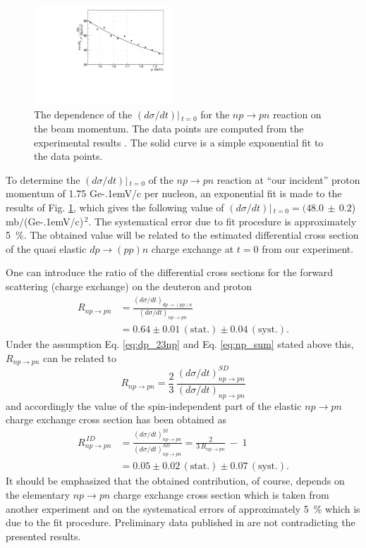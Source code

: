 \documentclass[twocolumn,epjc3]{svjour3}
\newcommand{\np}     {\ensuremath{np \rightarrow pn}\xspace}
\newcommand{\dpchex} {\ensuremath{dp \rightarrow (pp)n}\xspace}
\newcommand{\GeVc}   {Ge\kern-.1emV/c\xspace}
\begin{document}
\begin{figure}[ht]
  \centering
  \includegraphics[width=0.47\textwidth]{np_dSigma.pdf}
  \caption{The dependence of the $(d\sigma/dt)|\,_{t=0}$ for the \np reaction on
    the beam momentum. The data points are computed from the experimental
    results \cite{biz75}. The solid curve is a simple exponential fit to the
    data points.}
  \label{fig:npsigma}
\end{figure}

To determine the $(d\sigma/dt)|\,_{t=0}$ of the \np reaction at ``our incident''
proton momentum of 1.75 \GeVc per nucleon, an exponential fit is made to the
results of Fig. \ref{fig:npsigma}, which gives the following value of
$(d\sigma/dt)|\,_{t=0} = (48.0\,\pm\,0.2$) mb$/$(\GeVc)$^{\,2}$. The
systematical error due to fit procedure is approximately 5~\%. The obtained
value will be related to the estimated differential cross section of the quasi
elastic \dpchex charge exchange at $t=0$ from our experiment.

One can introduce the ratio of the differential cross sections for the forward
scattering (charge exchange) on the deuteron and proton
\begin{equation}
  \begin{split}
    R_{\np} &= \frac{(d\sigma/dt)_{\dpchex}}{(d\sigma/dt)_{\np}} \\
    &= 0.64 \pm 0.01\,\mathrm{(stat.)} \pm 0.04\,\mathrm{(syst.)}.
  \end{split}
\end{equation}
Under the assumption Eq. \eqref{eq:dp_23np} and Eq. \eqref{eq:np_sum} stated
above this, $R_{\np}$ can be related to
\begin{equation}
  R_{\np} = \frac{2}{3}\,\frac{(d\sigma/dt)^{SD}_{\np}}{(d\sigma/dt)_{\np}}
\end{equation}
and accordingly the value of the spin-independent part of the elastic \np charge
exchange cross section has been obtained as
\begin{equation}
  \begin{split}
    R^{\,ID}_{\np} &= \frac{(d\sigma/dt)^{SI}_{\np}}{(d\sigma/dt)^{SD}_{\np}}
    = \frac{2}{3\,R_{\np}} \ - \ 1 \\
    &= 0.05 \pm 0.02\,\mathrm{(stat.)} \pm 0.07\,\mathrm{(syst.)}.
  \end{split}
\end{equation}
It should be emphasized that the obtained contribution, of course, depends on
the elementary \np charge exchange cross section which is taken from another
experiment and on the systematical errors of approximately 5~\% which is due to
the fit procedure. Preliminary data published in \cite{bas14,bas16} are not
contradicting the presented results.
\end{document}
